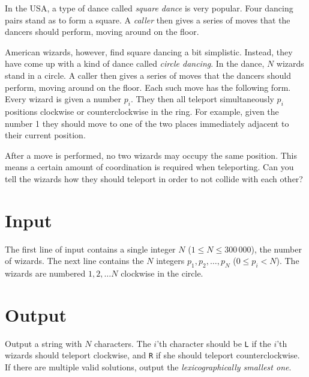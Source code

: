
\noindent
In the USA, a type of dance called \emph{square dance} is very popular.
Four dancing pairs stand as to form a square.
A \emph{caller} then gives a series of moves that the dancers should perform, moving around on the floor.

American wizards, however, find square dancing a bit simplistic.
Instead, they have come up with a kind of dance called \emph{circle dancing}.
In the dance, $N$ wizards stand in a circle.
A caller then gives a series of moves that the dancers should perform, moving around on the floor.
Each such move has the following form.
Every wizard is given a number $p_i$.
They then all teleport simultaneously $p_i$ positions clockwise or counterclockwise in the ring.
For example, given the number 1 they should move to one of the two places immediately adjacent to their current position.

After a move is performed, no two wizards may occupy the same position.
This means a certain amount of coordination is required when teleporting.
Can you tell the wizards how they should teleport in order to not collide with each other?

\section*{Input}
The first line of input contains a single integer $N$ ($1 \le N \le 300\,000$), the number of wizards.
The next line contains the $N$ integers $p_1, p_2, \dots, p_N$ ($0 \le p_i < N$).
The wizards are numbered $1, 2, \dots N$ clockwise in the circle.

\section*{Output}
Output a string with $N$ characters.
The $i$'th character should be \texttt{L} if the $i$'th wizards should teleport clockwise, and \texttt{R} if she should teleport counterclockwise.
If there are multiple valid solutions, output the \emph{lexicographically smallest one}.
